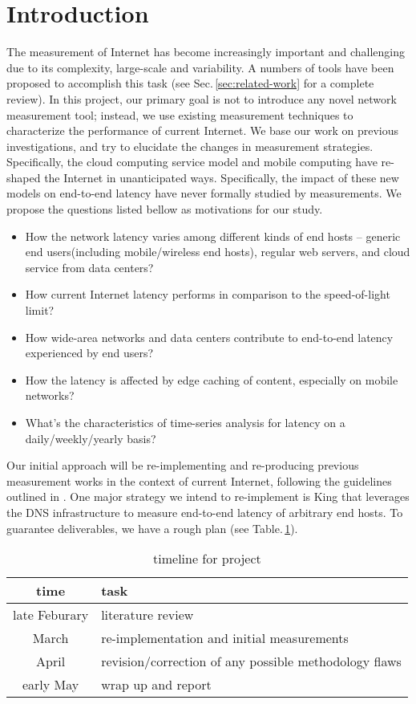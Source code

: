 \section{Introduction}
\label{sec:introduction}

The measurement of Internet has become increasingly important and challenging due to its complexity, large-scale and variability. A numbers of tools have been proposed to accomplish this task (see Sec.\,\ref{sec:related-work} for a complete review). In this project, our primary goal is not to introduce any novel network measurement tool; instead, we use existing measurement techniques to characterize the performance of current Internet. We base our work on previous investigations, and try to elucidate the changes in measurement strategies. Specifically, the cloud computing service model and mobile computing have re-shaped the Internet in unanticipated ways. Specifically, the impact of these new models on end-to-end latency have never formally studied by measurements. We propose the questions listed bellow as motivations for our study.

\begin{itemize}
\item How the network latency varies among different kinds of end hosts -- generic end users(including mobile/wireless end hosts), regular web servers, and cloud service from data centers?
\item How current Internet latency performs in comparison to the speed-of-light limit?
\item How wide-area networks and data centers contribute to end-to-end latency experienced by end users?
\item How the latency is affected by edge caching of content, especially on mobile networks?
\item What's the characteristics of time-series analysis for latency on a daily/weekly/yearly basis?
\end{itemize}

Our initial approach will be re-implementing and re-producing previous measurement works in the context of current Internet, following the guidelines outlined in \cite{paxson2004strategies}. One major strategy we intend to re-implement is King \cite{gummadi2002king} that leverages the DNS infrastructure to measure end-to-end latency of arbitrary end hosts. To guarantee deliverables, we have a rough plan (see Table.\,\ref{tab:plan}).

\begin{table}
  \centering
  \begin{tabular}{ c|p{4cm} }
    \hline
    time & task \\
    \hline
    late Feburary & literature review \\
    March & re-implementation and initial measurements \\
    April & revision/correction of any possible methodology flaws \\
    early May & wrap up and report \\ 
    \hline
  \end{tabular}
  \label{tab:plan}
  \caption{timeline for project}
\end{table}

